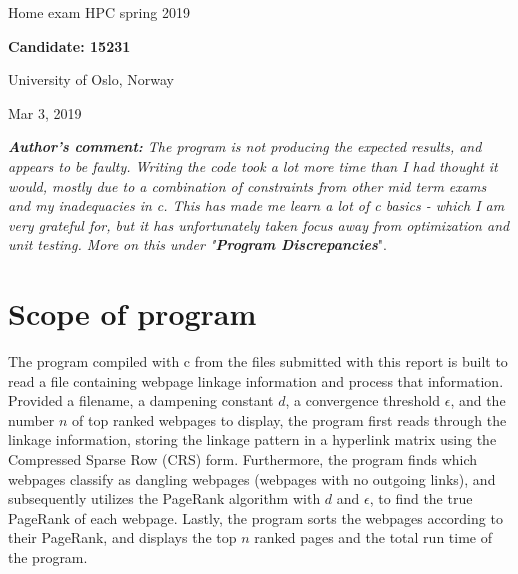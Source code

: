 \documentclass[%
oneside,                 %
final,                   %
10pt]{article}
\begin{document}

\newcommand{\exercisesection}[1]{\subsection*{#1}}






\thispagestyle{empty}

\begin{center}
{\LARGE\bf
\begin{spacing}{1.25}
Home exam HPC spring 2019
\end{spacing}
}
\end{center}


\begin{center}
{\bf Candidate: 15231}
\end{center}

    \begin{center}
\centerline{{\small University of Oslo, Norway}}
\end{center}
    

\begin{center}
Mar 3, 2019
\end{center}

\textit{\textbf{Author's comment:} The program is not producing the expected results, and appears to be faulty. Writing the code took a lot more time than I had thought it would, mostly due to a combination of  constraints from other mid term exams and my inadequacies in c. This has made me learn a lot of c basics - which I am very grateful for, but it has unfortunately taken focus away from optimization and unit testing.  More on this under "\textbf{Program Discrepancies}}".

\section{Scope of program}
The program compiled with c from the files submitted with this report is built to read a file containing webpage linkage information and process that information. Provided a filename, a dampening constant $d$, a convergence threshold $\epsilon$, and the number $n$ of top ranked webpages to display, the program first reads through the linkage information, storing the linkage pattern in a hyperlink matrix using the Compressed Sparse Row (CRS) form. Furthermore, the program finds which webpages classify as dangling webpages (webpages with no outgoing links), and subsequently utilizes the PageRank algorithm with $d$ and $\epsilon$,  to find the true PageRank of each webpage.  Lastly, the program sorts the webpages according to their PageRank, and displays the top $n$ ranked pages and the total run time of the program.
\end{document}
